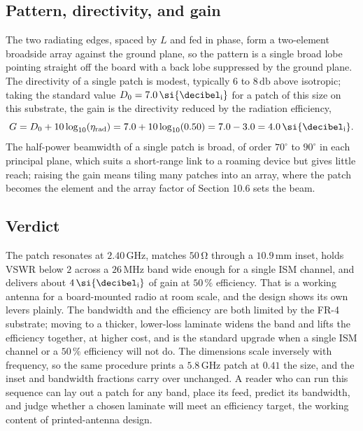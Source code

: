 

\subsection{Pattern, directivity, and gain}

The two radiating edges, spaced by $L$ and fed in phase, form a
two-element broadside array against the ground plane, so the pattern is
a single broad lobe pointing straight off the board with a back lobe
suppressed by the ground plane. The directivity of a single patch is
modest, typically $6$ to $8\,\si{\decibel}$ above isotropic; taking the
standard value $D_0 = 7.0\,\si{\decibel\textsubscript{i}}$ for a patch
of this size on this substrate, the gain is the directivity reduced by
the radiation efficiency,
\[
G = D_0 + 10\log_{10}(\eta_{\text{rad}}) = 7.0 + 10\log_{10}(0.50) =
7.0 - 3.0 = 4.0\,\si{\decibel\textsubscript{i}}.
\]
The half-power beamwidth of a single patch is broad, of order
$70^{\circ}$ to $90^{\circ}$ in each principal plane, which suits a
short-range link to a roaming device but gives little reach; raising the
gain means tiling many patches into an array, where the patch becomes
the element and the array factor of Section 10.6 sets the beam.

\subsection{Verdict}

The patch resonates at $2.40\,\si{\giga\hertz}$, matches $50\,\si{\ohm}$
through a $10.9\,\si{\milli\meter}$ inset, holds VSWR below $2$ across a
$26\,\si{\mega\hertz}$ band wide enough for a single ISM channel, and
delivers about $4\,\si{\decibel\textsubscript{i}}$ of gain at $50\,\%$
efficiency. That is a working antenna for a board-mounted radio at room
scale, and the design shows its own levers plainly. The bandwidth and
the efficiency are both limited by the FR-4 substrate; moving to a
thicker, lower-loss laminate widens the band and lifts the efficiency
together, at higher cost, and is the standard upgrade when a single ISM
channel or a $50\,\%$ efficiency will not do. The dimensions scale
inversely with frequency, so the same procedure prints a $5.8\,\si{\giga
\hertz}$ patch at $0.41$ the size, and the inset and bandwidth fractions
carry over unchanged. A reader who can run this sequence can lay out a
patch for any band, place its feed, predict its bandwidth, and judge
whether a chosen laminate will meet an efficiency target, the working
content of printed-antenna design.

